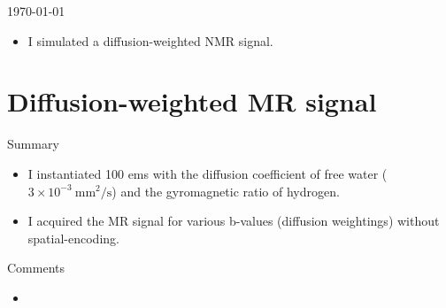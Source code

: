 \documentclass[dvipsnames]{beamer}
\begin{document}
\begin{frame}{\today}
\begin{itemize}
\item I simulated a diffusion-weighted NMR signal.
\end{itemize}
\end{frame}

\section{Diffusion-weighted MR signal}

\begin{frame}{Summary}
\begin{itemize}
\item I instantiated 100 ems with the diffusion coefficient of free water ($3 \times 10^{-3}~\mathrm{mm^2/s}$) and the gyromagnetic ratio of hydrogen.
\item I acquired the MR signal for various b-values (diffusion weightings) without spatial-encoding.
\end{itemize}
\end{frame}

\begin{frame}
\begin{center}
\end{center}
\end{frame}

\begin{frame}{Comments}
\begin{itemize}
\item 
\end{itemize}
\end{frame}
\end{document}

